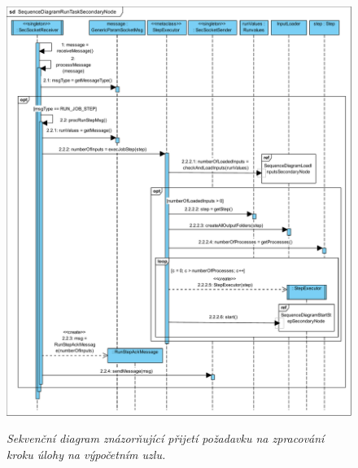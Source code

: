 \begin{figure}[H]
\begin{center}
    \scalebox{0.5}
    {
        \includegraphics{images/SequenceDiagramRunTaskSecondaryNode.pdf}
    }
    \caption{\label{obr:sequenceDiagramRunTaskSecondaryNode} {\it Sekvenční diagram znázorňující přijetí požadavku na zpracování kroku úlohy na výpočetním uzlu.}}
\end{center}
\end{figure}

